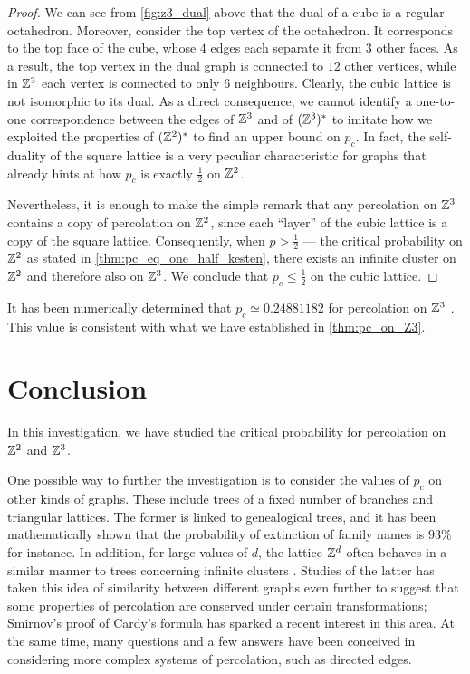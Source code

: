 \documentclass[a4paper, 12pt]{article}
\begin{document}
\begin{proof}
We can see from \cref{fig:z3_dual} above that the dual of a cube is a regular octahedron. Moreover, consider the top vertex of the octahedron. It corresponds to the top face of the cube, whose $4$ edges each separate it from $3$ other faces. As a result, the top vertex in the dual graph is connected to $12$ other vertices, while in $\mathbb{Z}^3$ each vertex is connected to only $6$ neighbours. Clearly, the cubic lattice is not isomorphic to its dual. As a direct consequence, we cannot identify a one-to-one correspondence between the edges of $\mathbb{Z}^3$ and of $(\mathbb{Z}^3)^*$ to imitate how we exploited the properties of $(\mathbb{Z}^2)^*$ to find an upper bound on $p_c$. In fact, the self-duality of the square lattice is a very peculiar characteristic for graphs that already hints at how $p_c$ is exactly $\frac{1}{2}$ on $\mathbb{Z}^2$.

Nevertheless, it is enough to make the simple remark that any percolation on $\mathbb{Z}^3$ contains a copy of percolation on $\mathbb{Z}^2$, since each ``layer'' of the cubic lattice is a copy of the square lattice. Consequently, when $p > \frac{1}{2}$ --- the critical probability on $\mathbb{Z}^2$ as stated in \cref{thm:pc_eq_one_half_kesten}, there exists an infinite cluster on $\mathbb{Z}^2$  and therefore also on $\mathbb{Z}^3$. We conclude that $p_c \leq \frac{1}{2}$ on the cubic lattice.
\end{proof}

\begin{rem*}
It has been numerically determined that $p_c \simeq 0.24881182$ for percolation on $\mathbb{Z}^3$ \autocite[7]{zhou_2014}. This value is consistent with what we have established in \cref{thm:pc_on_Z3}.
\end{rem*}

\section{Conclusion}
In this investigation, we have studied the critical probability for percolation on $\mathbb{Z}^2$ and $\mathbb{Z}^3$.

One possible way to further the investigation is to consider the values of $p_c$ on other kinds of graphs. These include trees of a fixed number of branches and triangular lattices. The former is linked to genealogical trees, and it has been mathematically shown that the probability of extinction of family names is $93\%$ \autocite[]{gennes_2000} for instance. In addition, for large values of $d$, the lattice $\mathbb{Z}^d$ often behaves in a similar manner to trees concerning infinite clusters \autocite[]{gennes_2000}. Studies of the latter has taken this idea of similarity between different graphs even further to suggest that some properties of percolation are conserved under certain transformations; Smirnov's proof of Cardy's formula \autocite*[1]{smirnov_2001} has sparked a recent interest in this area. At the same time, many questions and a few answers have been conceived in considering more complex systems of percolation, such as directed edges.
\end{document}

